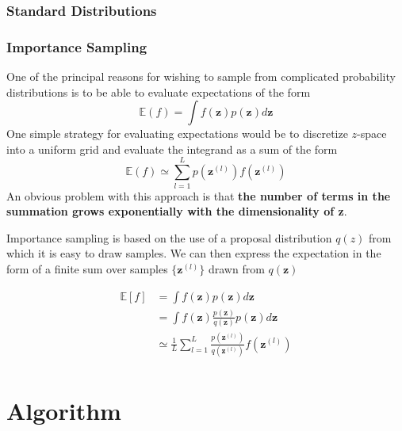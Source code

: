 \documentclass[a3paper, 12pt]{book} %
\begin{document}
\section{Standard Distributions}

\section{Importance Sampling}
One of the principal reasons for wishing to sample from complicated probability distributions is to be able to evaluate expectations of the form 
\begin{equation}
\mathbb{E}{(f)}=\int{f{(\mathbf{z})}p{(\mathbf{z})}}d{\mathbf{z}}
\end{equation}
One simple strategy for evaluating expectations would be to discretize $z$-space into a uniform grid and evaluate the integrand as a sum of the form
\begin{equation}
\mathbb{E}{(f)} \simeq \sum_{l=1}^{L}{p{(\mathbf{z}^{(l)})} f{(\mathbf{z}^{(l)})}}
\end{equation}
An obvious problem with this approach is that \textbf{the number of terms in the summation grows exponentially with the dimensionality of z}.

Importance sampling is based on the use of a proposal distribution $q(z)$ from which it is easy to draw samples. We can then express the expectation in the form of a finite sum over samples $\{\mathbf{z}^{(l)}\}$ drawn from $q(\mathbf{z})$

\begin{equation}
\begin{split}
\mathbb{E}{[f]} & = \int{f(\mathbf{z})p(\mathbf{z})d\mathbf{z}} \\
& = \int{f(\mathbf{z}) \frac{p(\mathbf{z})}{q(\mathbf{z})} p(\mathbf{z})d\mathbf{z}} \\
& \simeq \frac{1}{L} \sum_{l=1}^{L}{\frac{ p(\mathbf{z}^{(l)}) }{q(\mathbf{z}^{(l)})} } f(\mathbf{z}^{(l)})\\
\end{split}
\end{equation}

\part{Algorithm}
\end{document}
